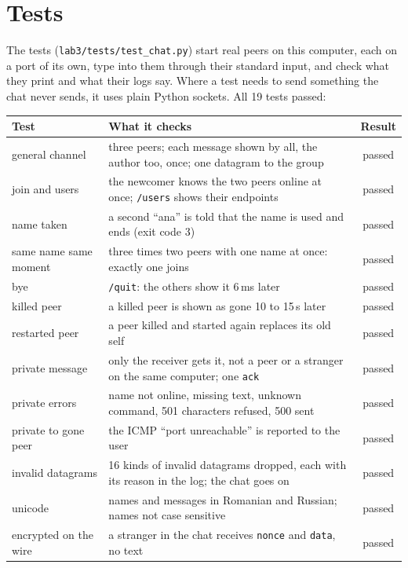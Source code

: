 \documentclass[11pt,a4paper]{article}
\newcommand{\code}[1]{{\frenchspacing\texttt{#1}}}
\begin{document}
\section{Tests}\label{sec:tests}

The tests (\code{lab3/tests/test\_chat.py}) start real peers on this computer, each on a port of its
own, type into them through their standard input, and check what they print and what their logs say.
Where a test needs to send something the chat never sends, it uses plain Python sockets. All 19 tests
passed:

\begin{center}
\small
\begin{tabularx}{\linewidth}{@{}lXc@{}}
\toprule
Test & What it checks & Result \\
\midrule
general channel & three peers; each message shown by all, the author too, once; one datagram to the group & passed \\
join and users & the newcomer knows the two peers online at once; \code{/users} shows their endpoints & passed \\
name taken & a second ``ana'' is told that the name is used and ends (exit code 3) & passed \\
same name same moment & three times two peers with one name at once: exactly one joins & passed \\
bye & \code{/quit}: the others show it 6\,ms later & passed \\
killed peer & a killed peer is shown as gone 10 to 15\,s later & passed \\
restarted peer & a peer killed and started again replaces its old self & passed \\
private message & only the receiver gets it, not a peer or a stranger on the same computer; one \code{ack} & passed \\
private errors & name not online, missing text, unknown command, 501 characters refused, 500 sent & passed \\
private to gone peer & the ICMP ``port unreachable'' is reported to the user & passed \\
invalid datagrams & 16 kinds of invalid datagrams dropped, each with its reason in the log; the chat goes on & passed \\
unicode & names and messages in Romanian and Russian; names not case sensitive & passed \\
encrypted on the wire & a stranger in the chat receives \code{nonce} and \code{data}, no text & passed \\

\end{tabularx}
\end{center}
\end{document}
